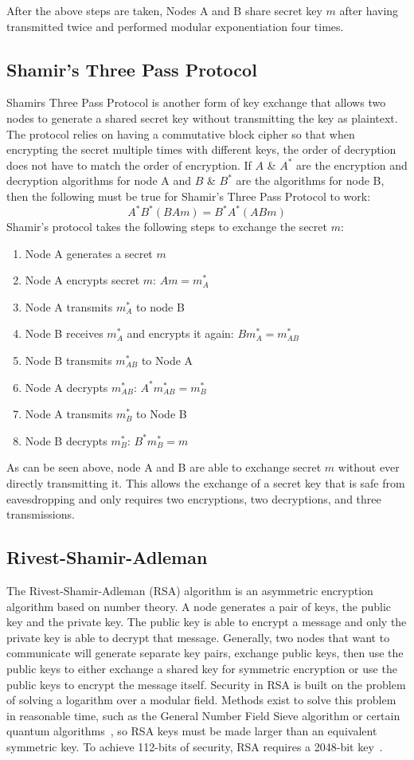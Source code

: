 \documentclass[journal]{IEEEtran}
\begin{document}
After the above steps are taken, Nodes A and B share secret key $m$ after having transmitted twice and performed modular exponentiation four times.

\subsection{Shamir's Three Pass Protocol}
Shamirs Three Pass Protocol is another form of key exchange that allows two nodes to generate a shared secret key without transmitting the key as plaintext. The protocol relies on having a commutative block cipher so that when encrypting the secret multiple times with different keys, the order of decryption does not have to match the order of encryption. If \(A\) \& \(A^*\) are the encryption and decryption algorithms for node A and \(B\) \& \(B^*\) are the algorithms for node B, then the following must be true for Shamir's Three Pass Protocol to work:
\[ A^*B^*(BAm) = B^*A^*(ABm) \] 
Shamir's protocol takes the following steps to exchange the secret \(m\):
\begin{enumerate}
        \item Node A generates a secret $m$
        \item Node A encrypts secret $m$: $Am = m^*_A$
        \item Node A transmits $m^*_A$ to node B
        \item Node B receives $m^*_A$ and encrypts it again: $Bm^*_A = m^*_{AB}$
        \item Node B transmits $m^*_{AB}$ to Node A
        \item Node A decrypts $m^*_{AB}$: $A^*m^*_{AB} = m^*_B$
        \item Node A transmits $m^*_B$ to Node B
        \item Node B decrypts $m^*_B$: $B^*m^*_B = m$
\end{enumerate}
As can be seen above, node A and B are able to exchange secret $m$ without ever directly transmitting it. This allows the exchange of a secret key that is safe from eavesdropping and only requires two encryptions, two decryptions, and three transmissions.

\subsection{Rivest-Shamir-Adleman}
The Rivest-Shamir-Adleman (RSA) algorithm is an asymmetric encryption algorithm based on number theory. A node generates a pair of keys, the public key and the private key. The public key is able to encrypt a message and only the private key is able to decrypt that message. Generally, two nodes that want to communicate will generate separate key pairs, exchange public keys, then use the public keys to either exchange a shared key for symmetric encryption or use the public keys to encrypt the message itself. Security in RSA is built on the problem of solving a logarithm over a modular field. Methods exist to solve this problem in reasonable time, such as the General Number Field Sieve algorithm or certain quantum algorithms~\cite{RSA1}, so RSA keys must be made larger than an equivalent symmetric key. To achieve 112-bits of security, RSA requires a 2048-bit key~\cite{PK2}.
\end{document}
